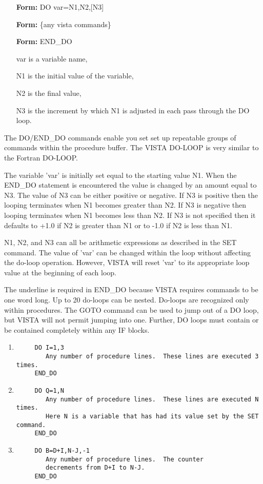 \begin{itemize}
  \item[\textbf{Form: } DO var=N1,N2,{[N3]}\hfill]{}
  \item[\textbf{Form: } \{any vista commands\}\hfill]{}
  \item[\textbf{Form: } END\_DO\hfill]{}
  \item[var]{is a variable name,}
  \item[N1]{is the initial value of the variable,}
  \item[N2]{is the final value,}
  \item[N3]{is the increment by which N1 is adjusted in
       each pass through the DO loop.}
\end{itemize}

The DO/END\_DO commands enable you set set up repeatable groups of commands
within the procedure buffer.  The VISTA DO-LOOP is very similar to the
Fortran DO-LOOP.

The variable 'var' is initially set equal to the starting value N1.  When
the END\_DO statement is encountered the value is changed by an amount
equal to N3. The value of N3 can be either positive or negative. If N3 is
positive then the looping terminates when N1 becomes greater than N2. If N3
is negative then looping terminates when N1 becomes less than N2.  If N3 is
not specified then it defaults to +1.0 if N2 is greater than N1 or to -1.0
if N2 is less than N1.

N1, N2, and N3 can all be arithmetic expressions as described in the SET
command.  The value of 'var' can be changed within the loop without
affecting the do-loop operation.  However, VISTA will reset 'var' to its
appropriate loop value at the beginning of each loop.

The underline is required in END\_DO because VISTA requires commands to be
one word long.  Up to 20 do-loops can be nested.  Do-loops are recognized
only within procedures. The GOTO command can be used to jump out of a DO
loop, but VISTA will not permit jumping into one. Further, DO loops must
contain or be contained completely within any IF blocks.

\begin{enumerate}
  \item{
  \begin{verbatim}
     DO I=1,3
        Any number of procedure lines.  These lines are executed 3 times.
     END_DO
  \end{verbatim}
}
  \item{
  \begin{verbatim}
     DO Q=1,N
        Any number of procedure lines.  These lines are executed N times.
        Here N is a variable that has had its value set by the SET command.
     END_DO
  \end{verbatim}
}
  \item{
  \begin{verbatim}
     DO B=D+I,N-J,-1
        Any number of procedure lines.  The counter
        decrements from D+I to N-J.
     END_DO
  \end{verbatim}
}
\end{enumerate}

